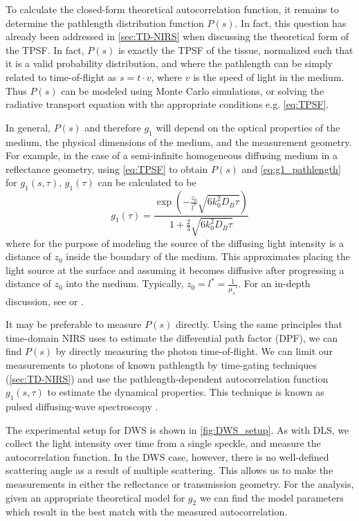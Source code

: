 To calculate the closed-form theoretical autocorrelation function, it remains to determine the pathlength distribution function $P(s)$. In fact, this question has already been addressed in \autoref{sec:TD-NIRS} when discussing the theoretical form of the TPSF. In fact, $P(s)$ is exactly the TPSF of the tissue, normalized such that it is a valid probability distribution, and where the pathlength can be simply related to time-of-flight as $s = t\cdot v$, where $v$ is the speed of light in the medium. Thus $P(s)$ can be modeled using Monte Carlo simulations, or solving the radiative transport equation with the appropriate conditions e.g. \autoref{eq:TPSF}. 

In general, $P(s)$ and therefore $g_1$ will depend on the optical properties of the medium, the physical dimensions of the medium, and the measurement geometry. For example, in the case of a semi-infinite homogeneous diffusing medium in a reflectance geometry, using \autoref{eq:TPSF} to obtain $P(s)$ and \autoref{eq:g1_pathlength} for $g_1(s, \tau)$, $g_1(\tau)$ can be calculated to be
\begin{equation}
g_1(\tau) = \frac{ \exp(-\frac{z_0}{l^*} \sqrt{6k_0^2D_B\tau}) }
                 { 1+ \frac{2}{3} \sqrt{6k_0^2D_B\tau}        }
\end{equation} 
where for the purpose of modeling the source of the diffusing light intensity is a distance of $z_0$ inside the boundary of the medium. This approximates placing the light source at the surface and assuming it becomes diffusive after progressing a distance of $z_0$ into the medium. Typically, $z_0 = l^* = \frac{1}{\mu_s'}$. For an in-depth discussion, see \cite[Section 4]{Pine1990} or \cite[ch. 16.2.3.4]{Brown1993}.

It may be preferable to measure $P(s)$ directly. Using the same principles that time-domain NIRS uses to estimate the differential path factor (DPF), we can find $P(s)$ by directly measuring the photon time-of-flight. We can limit our measurements to photons of known pathlength by time-gating techniques (\autoref{sec:TD-NIRS}) and use the pathlength-dependent autocorrelation function $g_1(s,\tau)$ to estimate the dynamical properties. This technique is known as pulsed diffusing-wave spectroscopy \cite{Yodh1990}.  

The experimental setup for DWS is shown in \autoref{fig:DWS_setup}. As with DLS, we collect the light intensity over time from a single speckle, and measure the autocorrelation function. In the DWS case, however, there is no well-defined scattering angle as a result of multiple scattering. This allows us to make the measurements in either the reflectance or transmission geometry. For the analysis, given an appropriate theoretical model for $g_2$ we can find the model parameters which result in the best match with the measured autocorrelation. 

